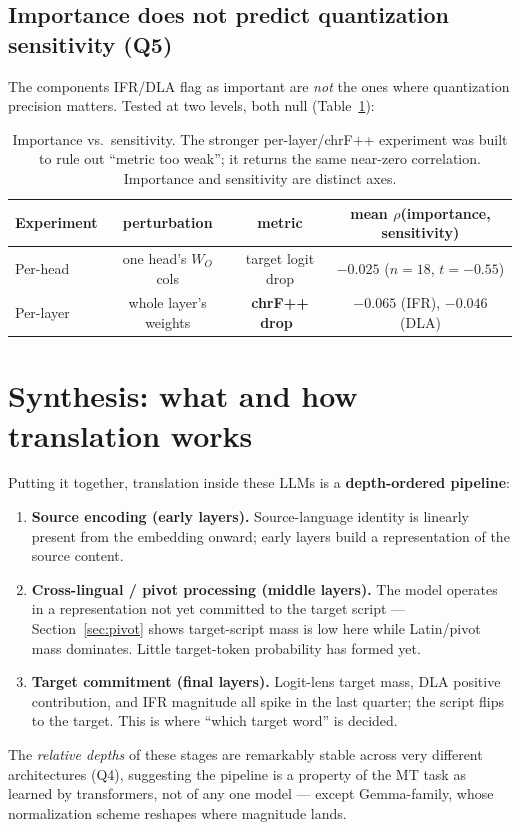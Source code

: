 \documentclass[11pt]{article}
\begin{document}
\subsection{Importance does not predict quantization sensitivity (Q5)}

The components IFR/DLA flag as important are \emph{not} the ones where
quantization precision matters. Tested at two levels, both null
(Table~\ref{tab:q5}):

\begin{table}[t]\centering\small
\begin{tabular}{lccc}
\toprule
Experiment & perturbation & metric & mean $\rho$(importance, sensitivity) \\
\midrule
Per-head & one head's $W_O$ cols & target logit drop & $-0.025$ ($n{=}18$, $t{=}{-}0.55$) \\
Per-layer & whole layer's weights & \textbf{chrF++ drop}~\citep{popovic2017chrf} & $-0.065$ (IFR), $-0.046$ (DLA) \\
\bottomrule
\end{tabular}
\caption{Importance vs.\ sensitivity. The stronger per-layer/chrF++
experiment was built to rule out ``metric too weak''; it returns the same
near-zero correlation. Importance and sensitivity are distinct axes.}
\label{tab:q5}
\end{table}

\section{Synthesis: what and how translation works}

Putting it together, translation inside these LLMs is a \textbf{depth-ordered
pipeline}:
\begin{enumerate}\itemsep1pt
\item \textbf{Source encoding (early layers).} Source-language identity is
linearly present from the embedding onward; early layers build a
representation of the source content.
\item \textbf{Cross-lingual / pivot processing (middle layers).} The model
operates in a representation not yet committed to the target script ---
Section~\ref{sec:pivot} shows target-script mass is low here while
Latin/pivot mass dominates. Little target-token probability has formed yet.
\item \textbf{Target commitment (final layers).} Logit-lens target mass, DLA
positive contribution, and IFR magnitude all spike in the last quarter; the
script flips to the target. This is where ``which target word'' is decided.
\end{enumerate}
The \emph{relative depths} of these stages are remarkably stable across very
different architectures (Q4), suggesting the pipeline is a property of the MT
task as learned by transformers, not of any one model --- except Gemma-family,
whose normalization scheme reshapes where magnitude lands.
\end{document}
